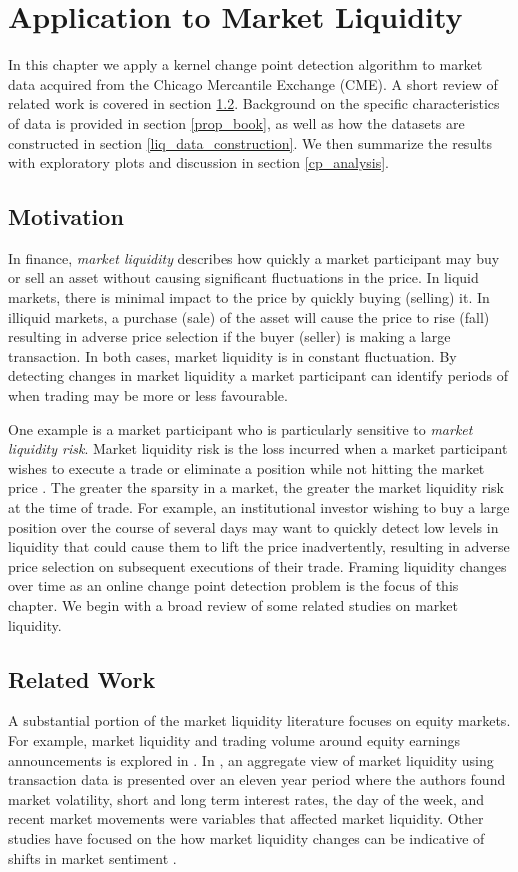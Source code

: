 \chapter{Application to Market Liquidity}
In this chapter we apply a kernel change point detection algorithm to market data acquired from the Chicago Mercantile Exchange (CME). A short review of related work is covered in section \ref{related_work}. Background on the specific characteristics of data is provided in section \ref{prop_book}, as well as how the datasets are constructed in section \ref{liq_data_construction}. We then summarize the results with exploratory plots and discussion in section \ref{cp_analysis}.

\section{Motivation}
In finance, \textit{market liquidity} describes how quickly a market participant may buy or sell an asset without causing significant fluctuations in the price. In liquid markets, there is minimal impact to the price by quickly buying (selling) it. In illiquid markets, a purchase (sale) of the asset will cause the price to rise (fall) resulting in adverse price selection if the buyer (seller) is making a large transaction. In both cases, market liquidity is in constant fluctuation. By detecting changes in market liquidity a market participant can identify periods of when trading may be more or less favourable. 

One example is a market participant who is particularly sensitive to \textit{market liquidity risk}. Market liquidity risk is the loss incurred when a market participant wishes to execute a trade or eliminate a position while not hitting the
market price \cite{basel2008principles}. The greater the sparsity in a market, the greater the market liquidity risk at the time of trade.  For example, an institutional investor wishing to buy a large position over the course of several days may want to quickly detect low levels in liquidity that could cause them to lift the price inadvertently, resulting in adverse price selection on subsequent executions of their trade. Framing liquidity changes over time as an online change point detection problem is the focus of this chapter. We begin with a broad review of some related studies on market liquidity.

\section{Related Work}
\label{related_work}
A substantial portion of the market liquidity literature focuses on equity markets. For example, market liquidity and trading volume around equity earnings announcements is explored in \cite{kim1994market}. In \cite{chordia2001market}, an aggregate view of market liquidity using transaction data is presented over an eleven year period where the authors found market volatility, short and long term interest rates, the day of the week, and recent market movements were variables that affected market liquidity. Other studies have focused on the how market liquidity changes can be indicative of shifts in market sentiment \cite{baker2004market} \cite{fang2009stock} \cite{debata2018investor}.

